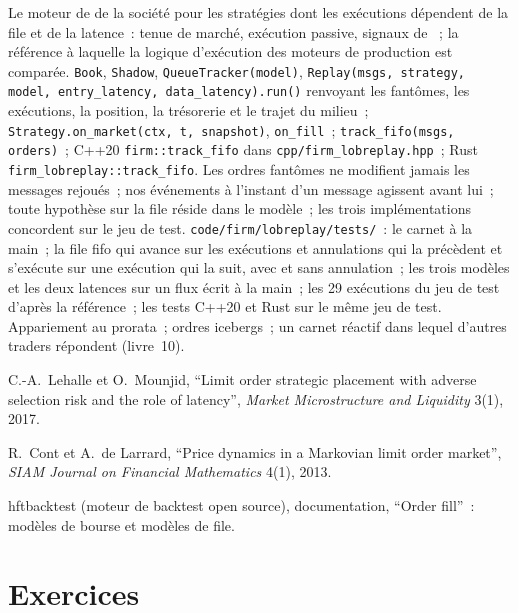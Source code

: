 \begin{build}
 Le moteur de  de la société pour les stratégies dont les exécutions dépendent de la file et de la latence~: tenue de marché, exécution passive, signaux de ~;
la référence à laquelle la logique d'exécution des moteurs de production est comparée.
 \texttt{Book}, \texttt{Shadow}, \texttt{QueueTracker(model)}, \texttt{Replay(msgs, strategy, model, entry\_latency, data\_latency).run()}
renvoyant les fantômes, les exécutions, la position, la trésorerie et le trajet du milieu~; \texttt{Strategy.on\_market(ctx, t, snapshot)}, \texttt{on\_fill}~; \texttt{track\_fifo(msgs,
orders)}~; C++20 \texttt{firm::track\_fifo} dans \texttt{cpp/firm\_lobreplay.hpp}~; Rust \texttt{firm\_lobreplay::track\_fifo}.
 Les ordres fantômes ne modifient jamais les messages rejoués~; nos événements à l'instant d'un message agissent avant lui~; toute hypothèse sur la file réside dans le modèle~;
les trois implémentations concordent sur le jeu de test.
 \texttt{code/firm/lobreplay/tests/}~: le carnet à la main~; la file fifo qui avance sur les exécutions et annulations qui la précèdent et s'exécute sur
une exécution qui la suit, avec et sans annulation~; les trois modèles et les deux latences sur un flux écrit à la main~; les 29 exécutions du jeu de test d'après la référence~;
les tests C++20 et Rust sur le même jeu de test.
 Appariement au prorata~; ordres icebergs~; un carnet réactif dans lequel d'autres traders répondent (livre~10).
\end{build}

\begin{omsources}
\item C.-A.~Lehalle et O.~Mounjid, ``Limit order strategic placement with adverse selection risk and the role of latency'', \emph{Market Microstructure and
Liquidity} 3(1), 2017.
\item R.~Cont et A.~de Larrard, ``Price dynamics in a Markovian limit order market'', \emph{SIAM Journal on Financial Mathematics} 4(1), 2013.
\item hftbacktest (moteur de backtest open source), documentation, ``Order fill''~: modèles de bourse et modèles de file.
\end{omsources}

\section{Exercices}

